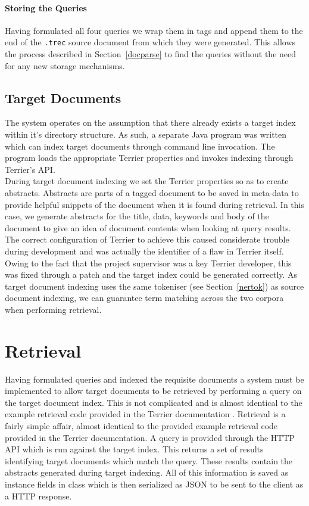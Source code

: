 \documentclass{l4proj}
\newcommand{\code}[1]{\texttt{#1}}
\begin{document}
\paragraph{Storing the Queries}
Having formulated all four queries we wrap them in tags and append them to the end of the \code{.trec} source document from which they were generated. This allows the process described in Section~\ref{docparse} to find the queries without the need for any new storage mechanisms.

\subsection{Target Documents}
The system operates on the assumption that there already exists a target index within it's directory structure.
As such, a separate Java program was written which can index target documents through command line invocation. The program loads the appropriate Terrier properties and invokes indexing through Terrier's API. \\ During target document indexing we set the Terrier properties so as to create abstracts. Abstracts are parts of a tagged document to be saved in meta-data to provide helpful snippets of the document when it is found during retrieval. In this case, we generate abstracts for the title, data, keywords and body of the document to give an idea of document contents when looking at query results.
The correct configuration of Terrier to achieve this caused considerate trouble during development and was actually the identifier of a flaw in Terrier itself. Owing to the fact that the project supervisor was a key Terrier developer, this was fixed through a patch and the target index could be generated correctly.
As target document indexing uses the same tokeniser (see Section~\ref{nertok}) as source document indexing, we can guarantee term matching across the two corpora when performing retrieval.

\section{Retrieval}
Having formulated queries and indexed the requisite documents a system must be implemented to allow target documents to be retrieved by performing a query on the target document index. This is not complicated and is almost identical to the example retrieval code provided in the Terrier documentation \cite{terrier_retrieval}.
Retrieval is a fairly simple affair, almost identical to the provided example retrieval code provided in the Terrier documentation.
A query is provided through the HTTP API which is run against the target index. This returns a set of results identifying target documents which match the query. These results contain the abstracts generated during target indexing. All of this information is saved as instance fields in class which is then serialized as JSON to be sent to the client as a HTTP response.
\end{document}
